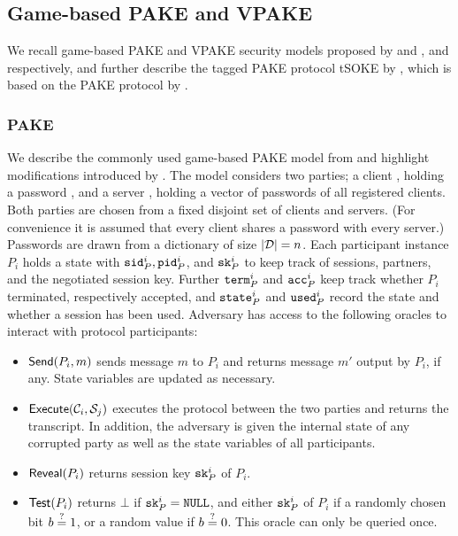 \subsection{Game-based PAKE and VPAKE}
We recall game-based \ac{PAKE} and \ac{VPAKE} security models proposed by \citet{Bellare2000} and \citet{Abdalla2005}, and \citet{BenhamoudaP13} respectively, and further describe the tagged \ac{PAKE} protocol tSOKE by \citet{Manulis2014}, which is based on the \ac{PAKE} protocol by \citet{Abdalla2006a}.

\subsubsection{PAKE} \label{sec:pake-model}
We describe the commonly used game-based \ac{PAKE} model from \citet{Bellare2000} and highlight modifications introduced by \citet{Abdalla2005}.
The model considers two parties; a client \Client, holding a password \pwd, and a server \Server, holding a vector of passwords of all registered clients.
Both parties are chosen from a fixed disjoint set of clients and servers.
(For convenience it is assumed that every client shares a password with every server.)
Passwords \pwd are drawn from a dictionary \cD of size $|\mathcal{D}|=n$.
Each participant instance $P_i$ holds a state with $\mathtt{sid}_P^i, \mathtt{pid}_P^i$, and $\mathtt{sk}_P^i$ to keep track of sessions, partners, and the negotiated session key.
Further $\mathtt{term}_P^i$ and $\mathtt{acc}_P^i$ keep track whether $P_i$ terminated, respectively accepted, and $\mathtt{state}_P^i$ and $\mathtt{used}_P^i$ record the state and whether a session has been used.
Adversary \cA has access to the following oracles to interact with protocol participants:

\begin{itemize}
  \item $\mathsf{Send}(P_i, m)$ sends message $m$ to $P_i$ and returns message $m'$ output by $P_i$, if any.
    State variables are updated as necessary.
    
  \item $\mathsf{Execute}(\mathcal{C}_i, \mathcal{S}_{j})$ executes the protocol between the two parties and returns the transcript.
    In addition, the adversary is given the internal state of any corrupted party as well as the state variables of all participants.
  
  \item $\mathsf{Reveal}(P_i)$ returns session key $\mathtt{sk}_{P}^i$ of $P_i$.
  
  \item $\mathsf{Test}(P_i)$ returns $\bot$ if $\mathtt{sk}_{P}^i=\mathtt{NULL}$, and either $\mathtt{sk}_{P}^i$ of $P_i$ if a randomly chosen bit $b\stackrel{?}{=} 1$, or a random value if $b\stackrel{?}{=} 0$.
    This oracle can only be queried once.
\end{itemize}

